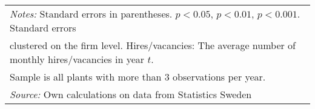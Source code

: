 \begin{table}[htbp]
\begin{tabularx} {\textwidth} { l  cXcXcXcc}
\multicolumn{9}{l}{\footnotesize \emph{Notes:} Standard errors in parentheses. \sym{*} \(p<0.05\), \sym{**} \(p<0.01\), \sym{***} \(p<0.001\). Standard errors}\\
\multicolumn{9}{l}{\footnotesize clustered on the firm level. Hires/vacancies: The average number of monthly hires/vacancies in year $t$. }\\
\multicolumn{9}{l}{\footnotesize Sample is all plants with more than 3 observations per year.}\\
\multicolumn{9}{l}{\footnotesize \emph{Source:} Own calculations on data from Statistics Sweden}\\
\end{tabularx}
\end{table}




